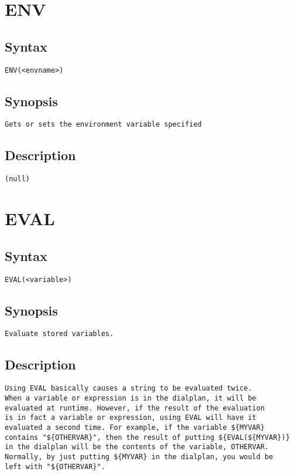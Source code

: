 \section{ENV}
\subsection{Syntax}
\begin{verbatim}
ENV(<envname>)
\end{verbatim}
\subsection{Synopsis}
\begin{verbatim}
Gets or sets the environment variable specified
\end{verbatim}
\subsection{Description}
\begin{verbatim}
(null)
\end{verbatim}


\section{EVAL}
\subsection{Syntax}
\begin{verbatim}
EVAL(<variable>)
\end{verbatim}
\subsection{Synopsis}
\begin{verbatim}
Evaluate stored variables.
\end{verbatim}
\subsection{Description}
\begin{verbatim}
Using EVAL basically causes a string to be evaluated twice.
When a variable or expression is in the dialplan, it will be
evaluated at runtime. However, if the result of the evaluation
is in fact a variable or expression, using EVAL will have it
evaluated a second time. For example, if the variable ${MYVAR}
contains "${OTHERVAR}", then the result of putting ${EVAL(${MYVAR})}
in the dialplan will be the contents of the variable, OTHERVAR.
Normally, by just putting ${MYVAR} in the dialplan, you would be
left with "${OTHERVAR}".

\end{verbatim}


